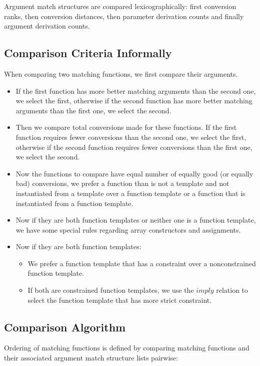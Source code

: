 \documentclass[a4paper,oneside,11pt]{book}
\theoremstyle{definition}
\begin{document}
Argument match structures are compared lexicographically: first conversion ranks, then conversion distances, then parameter derivation counts and finally
argument derivation counts.

\subsection{Comparison Criteria Informally}

When comparing two matching functions, we first compare their arguments.
\begin{itemize}
\item
If the first function has more better matching arguments than the second one,
we select the first, otherwise if the second function has more better matching arguments than the first one, we select the second.
\item
Then we compare total conversions made for these functions. If the first function requires fewer conversions than the second one, we select the first,
otherwise if the second function requires fewer conversions than the first one, we select the second.
\item
Now the functions to compare have equal number of equally good (or equally bad) conversions,
we prefer a function than is not a template and not instantiated from a template over
a function template or a function that is instantiated from a function template.
\item
Now if they are both function templates or neither one is a function template, we have some special rules regarding array constructors and assignments.
\item
Now if they are both function templates:
\begin{itemize}
\item
We prefer a function template that has a constraint over a nonconstrained function template.
\item
If both are constrained function templates, we use the $imply$ relation to select the function template that has more strict constraint.
\end{itemize}
\end{itemize}

\subsection{Comparison Algorithm}

Ordering of matching functions is defined by comparing matching functions and their associated argument match structure lists pairwise:
\end{document}
